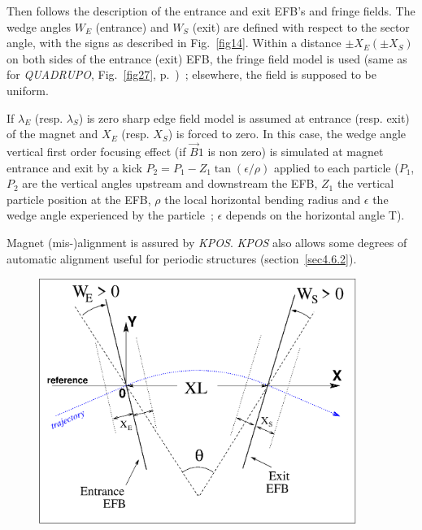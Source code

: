 \bigskip

\noindent Then follows the description of the entrance and exit EFB's and
fringe fields.       The wedge angles $W_E $ 
(entrance) and $W_S $ (exit) are defined with respect to the sector angle, 
with the signs as described in Fig.~\ref{fig14}.  
Within a distance $ \pm X_E(\pm X_S) $ on both sides of the entrance (exit) EFB, 
the fringe field model is used (same as for \textsl{QUADRUPO}, 
Fig.~\ref{fig27}, p.~\pageref{fig27})~; elsewhere, the field is supposed to be uniform. 

\bigskip

\noindent If $\lambda_{E} $ (resp. $\lambda_{S} $) is zero sharp edge field model is assumed at entrance 
(resp. exit) of the magnet and $X_E$ (resp. $X_S$) is forced to zero.  In this case, the wedge angle vertical first order 
focusing effect (if $\vec  B1$ is non zero) is simulated at magnet entrance and exit by a kick 
$P_2 = P_1 - Z_1 \tan (\epsilon / \rho)$ applied to each particle ($P_1$, $P_2$ are the vertical angles 
upstream and downstream the EFB, $Z_1$ the vertical particle position at the EFB, $\rho$ the local horizontal 
bending radius and $\epsilon$ the wedge angle experienced by the particle~; $\epsilon$ depends on the horizontal angle T).


\bigskip

\noindent Magnet (mis-)alignment is assured by \textsl{KPOS}. 
\textsl{KPOS} also  allows some degrees of automatic alignment useful for periodic structures (section~\ref{sec4.6.2}).

\vfill
\begin{figure}[H]
  \centerline{\includegraphics[height=8cm]{Fig14.eps}}
  {\setlength{\captionwidth}{12cm}
	\hangcaption[Fig14]{\label{fig14}
               \CapBEND
    } }
\end{figure}

